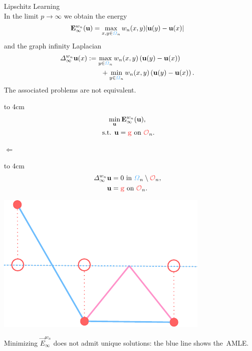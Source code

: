 %
%
\hfill%
%
%
\begin{minipage}[t][\topHeight][t]{\topWidth}%
{\color{BaseDarkColor} Lipschitz Learning}\\%
In the limit $p\to\infty$ we obtain the energy
\begin{align*}
\vec E_\infty^{w_n}(\vec u) = \max_{x,y\in\domain_n}w_n(x,y)|\vec u(y)-\vec u(x)|
\end{align*}
%
and the graph infinity Laplacian
%
{\small%
\begin{align*}
\Delta^{w_n}_\infty \vec u(x)
&:= 
\max_{y\in\domain_n} w_n(x,y) \left(\vec u(y) - \vec u(x)\right)
\\
&\qquad
+ 
\min_{y\in\domain_n} w_n(x,y) \left(\vec u(y) - \vec u(x)\right).
\end{align*}}%
%
The associated problems are not equivalent.
%
\begin{minipage}{.45\textwidth}%
\begin{block}{}%
\vbox to 4cm {%
\belowdisplayskip=0pt%
\abovedisplayskip=0pt%
\begin{gather*}
\min_{\vec u} \vec{E}^{w_n}_\infty (\vec u),\\
\text{ s.t. } \vec u = \color{grape}\vec g\nc \text{ on } \constr_n.
\end{gather*}\vfill}%
\end{block}
\end{minipage}%
\hfill%
$\Leftarrow$%
\hfill%
%
\begin{minipage}{.45\textwidth}%
\begin{block}{}
\vbox to 4cm {%
\belowdisplayskip=0pt%
\abovedisplayskip=0pt%
\begin{align*}
\Delta^{w_n}_\infty\vec u&= 0\text{ in } \domain_n\setminus\constr_n,\\
\vec u &= \color{grape}\vec g \nc \text{ on } \constr_n.
\end{align*}\vfill}%
\end{block}
\end{minipage}%
%
\vspace{1em}%

\begin{minipage}{.5\textwidth}%
\centering%
\includegraphics[width=.7\textwidth]{atelier/amle.pdf}%
\end{minipage}%
\begin{minipage}{.5\textwidth}%
Minimizing $\vec E_\infty^{w_n}$ does not admit unique solutions: the blue line shows the~\alert{AMLE}.
\end{minipage}%

\end{minipage}%
\hfill%